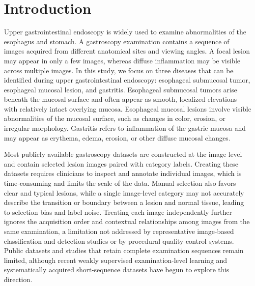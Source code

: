 \documentclass[Afour,sagev,times]{sagej}
\begin{document}

\maketitle

\section{Introduction}

Upper gastrointestinal endoscopy is widely used to examine abnormalities of the esophagus and stomach. A gastroscopy examination contains a sequence of images acquired from different anatomical sites and viewing angles. A focal lesion may appear in only a few images, whereas diffuse inflammation may be visible across multiple images. In this study, we focus on three diseases that can be identified during upper gastrointestinal endoscopy: esophageal submucosal tumor, esophageal mucosal lesion, and gastritis. Esophageal submucosal tumors arise beneath the mucosal surface and often appear as smooth, localized elevations with relatively intact overlying mucosa. Esophageal mucosal lesions involve visible abnormalities of the mucosal surface, such as changes in color, erosion, or irregular morphology. Gastritis refers to inflammation of the gastric mucosa and may appear as erythema, edema, erosion, or other diffuse mucosal changes.

Most publicly available gastroscopy datasets are constructed at the image level and contain selected lesion images paired with category labels. Creating these datasets requires clinicians to inspect and annotate individual images, which is time-consuming and limits the scale of the data. Manual selection also favors clear and typical lesions, while a single image-level category may not accurately describe the transition or boundary between a lesion and normal tissue, leading to selection bias and label noise. Treating each image independently further ignores the acquisition order and contextual relationships among images from the same examination, a limitation not addressed by representative image-based classification and detection studies or by procedural quality-control systems. Public datasets and studies that retain complete examination sequences remain limited, although recent weakly supervised examination-level learning and systematically acquired short-sequence datasets have begun to explore this direction.
\end{document}
